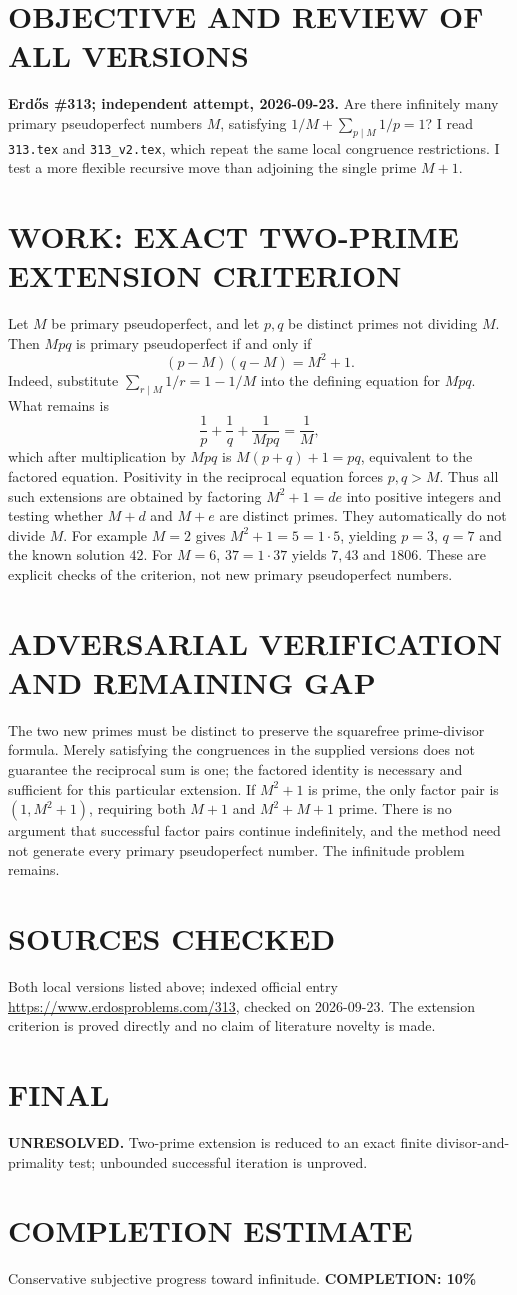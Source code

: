 \section{OBJECTIVE AND REVIEW OF ALL VERSIONS}
\textbf{Erd\H{o}s \#313; independent attempt, 2026-09-23.}
Are there infinitely many primary pseudoperfect numbers $M$, satisfying $1/M+\sum_{p\mid M}1/p=1$? I read \texttt{313.tex} and \texttt{313\_v2.tex}, which repeat the same local congruence restrictions. I test a more flexible recursive move than adjoining the single prime $M+1$.
\section{WORK: EXACT TWO-PRIME EXTENSION CRITERION}
Let $M$ be primary pseudoperfect, and let $p,q$ be distinct primes not dividing $M$. Then $Mpq$ is primary pseudoperfect if and only if
\[
(p-M)(q-M)=M^2+1.
\]
Indeed, substitute $\sum_{r\mid M}1/r=1-1/M$ into the defining equation for $Mpq$. What remains is
\[
\frac1p+\frac1q+\frac1{Mpq}=\frac1M,
\]
which after multiplication by $Mpq$ is $M(p+q)+1=pq$, equivalent to the factored equation. Positivity in the reciprocal equation forces $p,q>M$. Thus all such extensions are obtained by factoring $M^2+1=de$ into positive integers and testing whether $M+d$ and $M+e$ are distinct primes. They automatically do not divide $M$.
For example $M=2$ gives $M^2+1=5=1\cdot5$, yielding $p=3$, $q=7$ and the known solution $42$. For $M=6$, $37=1\cdot37$ yields $7,43$ and $1806$. These are explicit checks of the criterion, not new primary pseudoperfect numbers.
\section{ADVERSARIAL VERIFICATION AND REMAINING GAP}
The two new primes must be distinct to preserve the squarefree prime-divisor formula. Merely satisfying the congruences in the supplied versions does not guarantee the reciprocal sum is one; the factored identity is necessary and sufficient for this particular extension. If $M^2+1$ is prime, the only factor pair is $(1,M^2+1)$, requiring both $M+1$ and $M^2+M+1$ prime. There is no argument that successful factor pairs continue indefinitely, and the method need not generate every primary pseudoperfect number. The infinitude problem remains.
\section{SOURCES CHECKED}
Both local versions listed above; indexed official entry \url{https://www.erdosproblems.com/313}, checked on 2026-09-23. The extension criterion is proved directly and no claim of literature novelty is made.
\section{FINAL}
\textbf{UNRESOLVED.} Two-prime extension is reduced to an exact finite divisor-and-primality test; unbounded successful iteration is unproved.
\section{COMPLETION ESTIMATE}
Conservative subjective progress toward infinitude.
\textbf{COMPLETION: 10\%}
